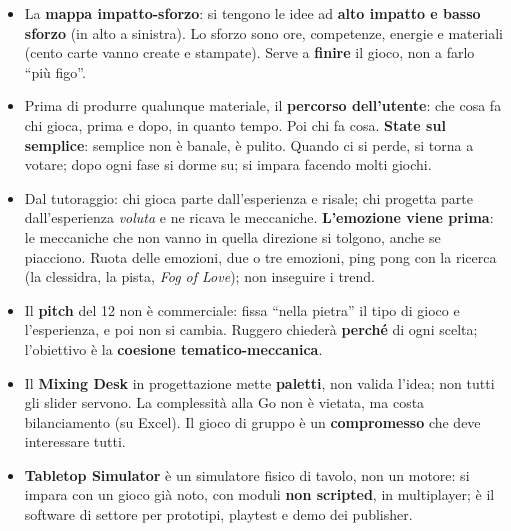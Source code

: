 \begin{itemize}
        contenuti'', come osserva Tiziana su \emph{Wingspan}).
  \item La \textbf{mappa impatto-sforzo}: si tengono le idee ad \textbf{alto impatto e
        basso sforzo} (in alto a sinistra). Lo sforzo sono ore, competenze, energie e
        materiali (cento carte vanno create e stampate). Serve a \textbf{finire} il
        gioco, non a farlo ``più figo''.
  \item Prima di produrre qualunque materiale, il \textbf{percorso dell'utente}: che
        cosa fa chi gioca, prima e dopo, in quanto tempo. Poi chi fa cosa.
        \textbf{State sul semplice}: semplice non è banale, è pulito. Quando ci si
        perde, si torna a votare; dopo ogni fase si dorme su; si impara facendo molti
        giochi.
  \item Dal tutoraggio: chi gioca parte dall'esperienza e risale; chi progetta parte
        dall'esperienza \emph{voluta} e ne ricava le meccaniche. \textbf{L'emozione
        viene prima}: le meccaniche che non vanno in quella direzione si tolgono, anche
        se piacciono. Ruota delle emozioni, due o tre emozioni, ping pong con la ricerca
        (la clessidra, la pista, \emph{Fog of Love}); non inseguire i trend.
  \item Il \textbf{pitch} del 12 non è commerciale: fissa ``nella pietra'' il tipo di
        gioco e l'esperienza, e poi non si cambia. Ruggero chiederà \textbf{perché} di
        ogni scelta; l'obiettivo è la \textbf{coesione tematico-meccanica}.
  \item Il \textbf{Mixing Desk} in progettazione mette \textbf{paletti}, non valida
        l'idea; non tutti gli slider servono. La complessità alla Go non è vietata, ma
        costa bilanciamento (su Excel). Il gioco di gruppo è un
        \textbf{compromesso} che deve interessare tutti.
  \item \textbf{Tabletop Simulator} è un simulatore fisico di tavolo, non un motore:
        si impara con un gioco già noto, con moduli \textbf{non scripted}, in
        multiplayer; è il software di settore per prototipi, playtest e demo dei
        publisher.
\end{itemize}
